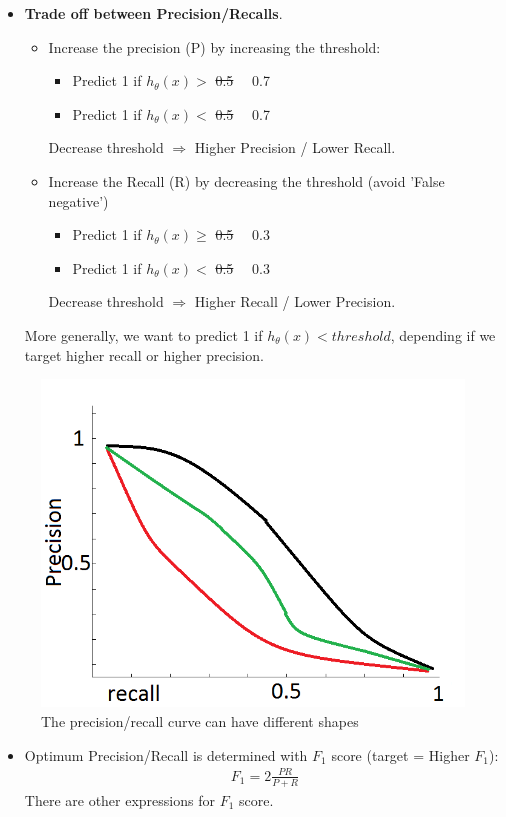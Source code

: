 \documentclass[a4paper,12pt]{report}
\begin{document}
\begin{itemize}
\item \textbf{Trade off between Precision/Recalls}.\\
\begin{itemize}
\item Increase the precision (P) by increasing the threshold:
\begin{itemize}
\item Predict 1 if $h_{\theta}(x) > $ \sout{0.5} \ \ 0.7
\item Predict 1 if $h_{\theta}(x) < $ \sout{0.5} \ \ 0.7
\end{itemize}
Decrease threshold $\Longrightarrow$ Higher Precision / Lower Recall.
\end{itemize}
\begin{itemize}
\item Increase the Recall (R) by decreasing the threshold (avoid 'False negative')
\begin{itemize}
\item Predict 1 if $h_{\theta}(x) \geq $ \sout{0.5} \ \ 0.3
\item Predict 1 if $h_{\theta}(x) < $ \sout{0.5} \ \ 0.3
\end{itemize}
Decrease threshold $\Longrightarrow$ Higher Recall / Lower Precision.
\end{itemize}
More generally, we want to predict 1 if $h_{\theta}(x) < threshold$, depending if we target higher recall or higher precision.
\end{itemize}
\begin{figure}[H]
\centering
        \includegraphics[totalheight=4 cm]{recallprec.png}
						\caption{
								\label{housingData} The precision/recall curve can have different shapes}
\end{figure}
\begin{itemize}
\item Optimum Precision/Recall is determined with $F_1$ score (target = Higher $F_1$):
\begin{align}
F_1 = 2 \frac{P R}{P + R}
\end{align}
There are other expressions for $F_1$ score.\
\end{itemize}
\end{document}
